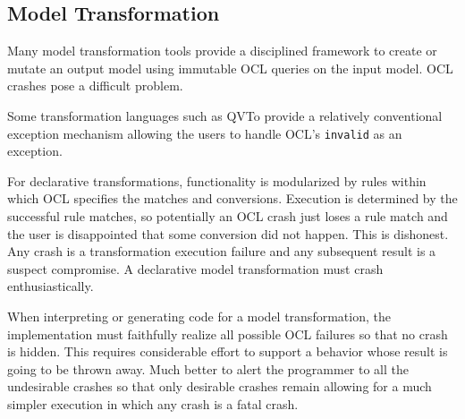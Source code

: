 \documentclass[
]{ceurart}
\begin{document}



\subsection{Model Transformation}

Many model transformation tools provide a disciplined framework to create or mutate an output model using immutable OCL queries on the input model. OCL crashes pose a difficult problem.

Some transformation languages such as QVTo \cite{QVT-1.3} provide a relatively conventional exception mechanism allowing the users to handle OCL's \verb|invalid| as an exception. %

For declarative transformations, functionality is modularized by rules within which OCL specifies the matches and conversions. Execution is determined by the successful rule matches, so potentially an OCL crash just loses a rule match and the user is disappointed that some conversion did not happen. This is dishonest. Any crash is a transformation execution failure and any subsequent result is a suspect compromise. A declarative model transformation must crash enthusiastically.

When interpreting or generating code for a model transformation, the implementation must faithfully realize all possible OCL failures so that no crash is hidden. This requires considerable effort to support a behavior whose result is going to be thrown away. Much better to alert the programmer to all the undesirable crashes so that only desirable crashes remain allowing for a much simpler execution in which any crash is a fatal crash.
 
 
\end{document}
